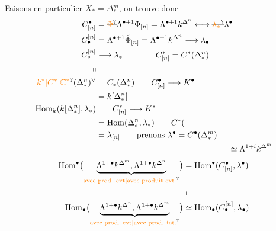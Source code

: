 Faisons en particulier $X_*=\Delta^m_*$, on trouve donc
\[
\begin{aligned}
C^\bullet_{[n]}&=\deleted{\unsure{\Phi}}\Lambda^{\bullet+1}\Phi_{[n]}=\Lambda^{\bullet+1}k^{\Delta^n}\longleftrightarrow\deleted{\unsure{\lambda_*}}\lambda^\bullet\\
C_\bullet^{[n]}&=\Lambda^{\bullet+1}\check\Phi_{[n]}=\Lambda^{\bullet+1}k^{\Delta^n}\longrightarrow\lambda_\bullet\\
C_*^{[n]}&\longrightarrow\lambda_*\qquad\qquad C^*_{[n]}=C^*(\Delta^n_*)\\
\shortparallel\\
\unsure{k^*|C^*|\mathbb C^*}(\Delta^n_*)^\vee&=C_*(\Delta^n_*)\qquad C^\bullet_{[n]}\longrightarrow K^\bullet\\
&=k[\Delta^n_*]\\
\operatorname{Hom}_k(k[\Delta^n_*],\lambda_*)&\qquad C^*_{[n]}\longrightarrow K^*\\
&=\operatorname{Hom}(\Delta^n_*,\lambda_*)\qquad C^*(\\
&=\lambda_{[n]}\qquad\text{prenons }\lambda^\bullet=C^\bullet(\Delta^m_*)\\
&\hspace{16em}\simeq\Lambda^{1+i}k^{\Delta^m}
\end{aligned}
\]
\[
\begin{aligned}
\operatorname{Hom}^\bullet\bigl(\underbrace{\Lambda^{1+\bullet}k^{\Delta^m},\Lambda^{1+\bullet}k^{\Delta^n}}_{\text{\unsure{avec prod. ext|avec produit ext.}}}\bigr)
 &=\operatorname{Hom}^\bullet(C^\bullet_{[n]},\lambda^\bullet)\\
 &\shortparallel\\
\operatorname{Hom}_\bullet\bigl(\underbrace{\Lambda^{1+\bullet}k^{\Delta^n},\Lambda^{1+\bullet}k^{\Delta^m}}_{\text{\unsure{avec prod. ext|avec prod. int.}}}\bigr)
 &\simeq\operatorname{Hom}_\bullet(C_\bullet^{[n]},\lambda_\bullet)
\end{aligned}
\]
